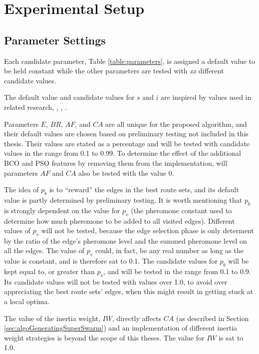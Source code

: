 \section{Experimental Setup}


\subsection{Parameter Settings}
\label{subsec:parameterSettings_setup}

Each candidate parameter, Table \vref{table:parameters}, is assigned a default value to be held constant while the other parameters are tested with \textit{xx} different candidate values.

The default value and candidate values for $s$ and $i$ are inspired by values used in related research\citep{salehi-nezhad07}, \citep{poorzahedy11}, \citep{sedighpour14}, \citep{kechagiopoulos14}.

Parameters $E$, $BR$, $AF$, and $CA$ are all unique for the proposed algorithm, and their default values are chosen based on preliminary testing not included in this thesis. Their values are stated as a percentage and will be tested with candidate values in the range from 0.1 to 0.99. To determine the effect of the additional BCO and PSO features by removing them from the implementation, will parameters $AF$ and $CA$ also be tested with the value 0.

The idea of $p_b$ is to ``reward'' the edges in the best route sets, and its default value is partly determined by preliminary testing. It is worth mentioning that $p_ b$ is strongly dependent on the value for $p_v$ (the pheromone constant used to determine how much pheromone to be added to all visited edges). Different values of $p_v$ will not be tested, because the edge selection phase is only determent by the ratio of the edge's pheromone level and the summed pheromone level on all the edges. The value of $p_v$ could, in fact, be any real number as long as the value is constant, and is therefore sat to 0.1. The candidate values for $p_b$ will be kept equal to, or greater than $p_v$, and will be tested in the range from 0.1 to 0.9. Its candidate values will not be tested with values over 1.0, to avoid over appreciating the best route sets' edges, when this might result in getting stuck at a local optima.

The value of the inertia weight, $IW$, directly affects $CA$ (as described in Section \vref{sec:algoGeneratingSuperSwarm}) and an implementation of different inertia weight strategies is beyond the scope of this theses. The value for $IW$ is sat to 1.0. 

